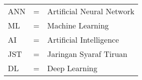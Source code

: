 
\begin{tabular}{llp{3in}}
		ANN	&  \hspace{1.5cm} = & Artificial Neural Network\\
		ML	&  \hspace{1.5cm} = & Machine Learning\\
		AI	&  \hspace{1.5cm} = & Artificial Intelligence\\
		JST & \hspace{1.5cm} = & Jaringan Syaraf Tiruan\\
		DL	&  \hspace{1.5cm} = & Deep Learning\\

\end{tabular}
